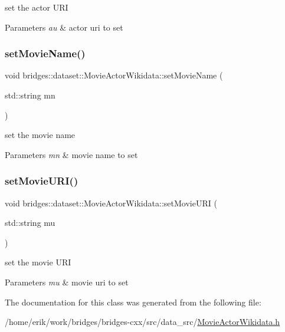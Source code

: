 set the actor U\+RI 
\begin{DoxyParams}{Parameters}
{\em au} & actor uri to set \\
\hline
\end{DoxyParams}
\mbox{\label{classbridges_1_1dataset_1_1_movie_actor_wikidata_abcb8bbf42fdabb1b13ffc04645be7c6e}} 
\subsubsection{\texorpdfstring{set\+Movie\+Name()}{setMovieName()}}
{\footnotesize\ttfamily void bridges\+::dataset\+::\+Movie\+Actor\+Wikidata\+::set\+Movie\+Name (\begin{DoxyParamCaption}\item[{std\+::string}]{mn }\end{DoxyParamCaption})\hspace{0.3cm}{\ttfamily [inline]}}

set the movie name 
\begin{DoxyParams}{Parameters}
{\em mn} & movie name to set \\
\hline
\end{DoxyParams}
\mbox{\label{classbridges_1_1dataset_1_1_movie_actor_wikidata_a0401689bb58878b12cf5e30182313129}} 
\subsubsection{\texorpdfstring{set\+Movie\+U\+R\+I()}{setMovieURI()}}
{\footnotesize\ttfamily void bridges\+::dataset\+::\+Movie\+Actor\+Wikidata\+::set\+Movie\+U\+RI (\begin{DoxyParamCaption}\item[{std\+::string}]{mu }\end{DoxyParamCaption})\hspace{0.3cm}{\ttfamily [inline]}}

set the movie U\+RI 
\begin{DoxyParams}{Parameters}
{\em mu} & movie uri to set \\
\hline
\end{DoxyParams}


The documentation for this class was generated from the following file\+:\begin{DoxyCompactItemize}
\item 
/home/erik/work/bridges/bridges-\/cxx/src/data\+\_\+src/\hyperlink{_movie_actor_wikidata_8h}{Movie\+Actor\+Wikidata.\+h}\end{DoxyCompactItemize}
